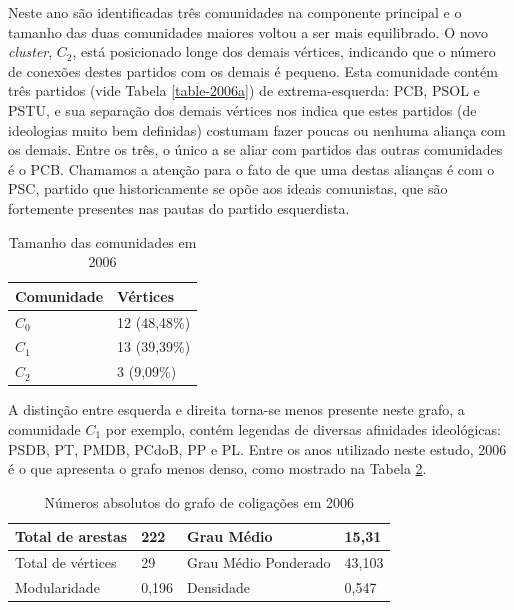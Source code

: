 Neste ano são identificadas três comunidades na componente principal e o tamanho das duas comunidades maiores voltou a ser mais equilibrado. O novo \emph{cluster}, $C_2$, está posicionado longe dos demais vértices, indicando que o número de conexões destes partidos com  os demais é pequeno. Esta comunidade contém três partidos (vide Tabela \eqref{table-2006a}) de extrema-esquerda: \gls{PCB}, \gls{PSOL} e \gls{PSTU}, e sua separação dos demais vértices nos indica que estes partidos (de ideologias muito bem definidas) costumam fazer poucas ou nenhuma aliança com os demais. Entre os três, o único a se aliar com partidos das outras comunidades é o \gls{PCB}. Chamamos a atenção para o fato de que uma destas alianças é com o \gls{PSC}, partido que historicamente se opõe aos ideais comunistas, que são fortemente presentes nas pautas do partido esquerdista.

\begin{table}[H]
\centering
\begin{tabular}{|l|l|}
\hline
Comunidade & Vértices \\ \hline
$C_0$         &      12 (48,48\%)                \\ \hline
$C_1$         &     13 (39,39\%)                \\ \hline
$C_2$         &       3 (9,09\%)               \\ \hline
\end{tabular}
\caption{Tamanho das comunidades em 2006}
\label{table-2006a}
\end{table}

A distinção entre esquerda e direita torna-se menos presente neste grafo, a comunidade $C_1$ por exemplo, contém legendas de diversas afinidades ideológicas: \gls{PSDB}, \gls{PT}, \gls{PMDB}, \gls{PCdoB}, \gls{PP} e \gls{PL}. Entre os anos utilizado neste estudo, 2006 é o que apresenta o grafo menos denso, como mostrado na Tabela \ref{table-2006b}.

\begin{table}[H]
\centering
\begin{tabular}{|l|l|l|l|}
\hline
Total de arestas  & 222 & Grau Médio           & 15,31 \\ \hline
Total de vértices & 29 & Grau Médio Ponderado & 43,103 \\ \hline
Modularidade      & 0,196 & Densidade            & 0,547 \\ \hline
\end{tabular}
\caption{Números absolutos do grafo de coligações em 2006}
\label{table-2006b}
\end{table}


